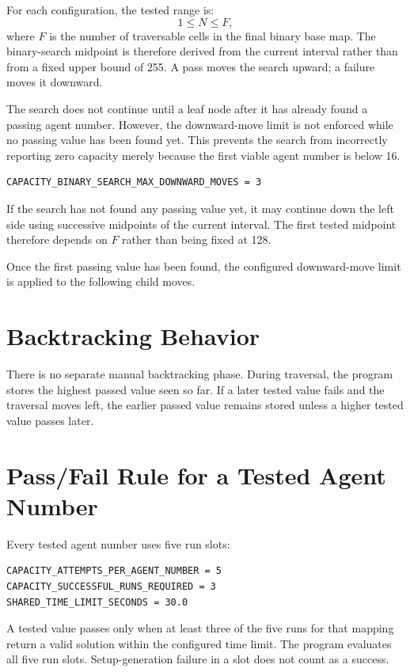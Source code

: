 \documentclass[11pt]{article}
\begin{document}
For each configuration, the tested range is:
\[
1 \leq N \leq F,
\]
where $F$ is the number of traversable cells in the final binary base map. The binary-search midpoint is therefore derived from the current interval rather than from a fixed upper bound of 255. A pass moves the search upward; a failure moves it downward.

The search does not continue until a leaf node after it has already found a passing agent number. However, the downward-move limit is not enforced while no passing value has been found yet. This prevents the search from incorrectly reporting zero capacity merely because the first viable agent number is below 16.

\begin{lstlisting}
CAPACITY_BINARY_SEARCH_MAX_DOWNWARD_MOVES = 3
\end{lstlisting}

If the search has not found any passing value yet, it may continue down the left side using successive midpoints of the current interval. The first tested midpoint therefore depends on $F$ rather than being fixed at 128.

Once the first passing value has been found, the configured downward-move limit is applied to the following child moves.

\section{Backtracking Behavior}

There is no separate manual backtracking phase. During traversal, the program stores the highest passed value seen so far. If a later tested value fails and the traversal moves left, the earlier passed value remains stored unless a higher tested value passes later.

\section{Pass/Fail Rule for a Tested Agent Number}

Every tested agent number uses five run slots:

\begin{lstlisting}
CAPACITY_ATTEMPTS_PER_AGENT_NUMBER = 5
CAPACITY_SUCCESSFUL_RUNS_REQUIRED = 3
SHARED_TIME_LIMIT_SECONDS = 30.0
\end{lstlisting}

A tested value passes only when at least three of the five runs for that mapping return a valid solution within the configured time limit. The program evaluates all five run slots. Setup-generation failure in a slot does not count as a success.
\end{document}
